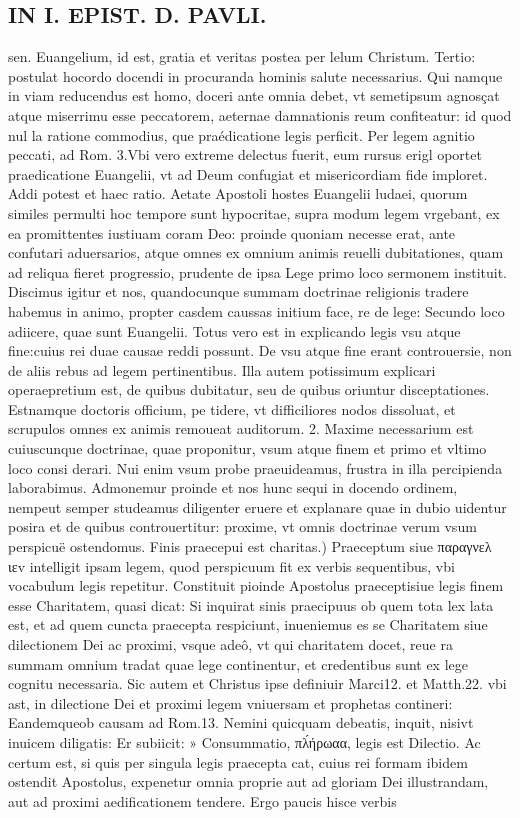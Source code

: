 \documentclass{article}
\begin{document}
\begin{pages}
\section*{IN I. EPIST. D. PAVLI. }
\marginpar{[ p.21 ]}\pstart sen. Euangelium, id est, gratia et veritas postea per lelum Christum.  \pend\pstart Tertio: postulat hocordo docendi in procuranda hominis salute necessarius. Qui namque  in viam reducendus est homo, doceri ante omnia debet, vt semetipsum agnosçat atque  miserrimu esse peccatorem, aeternae damnationis reum confiteatur: id quod nul la ratione commodius, que  praédicatione legis perficit. Per legem agnitio peccati, ad Rom. 3.Vbi vero extreme delectus fuerit, eum rursus erigl oportet praedicatione Euangelii, vt ad Deum confugiat et misericordiam fide imploret.  \pend\pstart Addi potest et haec ratio. Aetate Apostoli hostes Euangelii ludaei, quorum similes permulti hoc tempore sunt hypocritae, supra modum legem vrgebant, ex ea promittentes iustiuam coram Deo: proinde quoniam necesse erat, ante confutari aduersarios, atque omnes ex omnium animis reuelli dubitationes, quam ad reliqua fieret progressio, prudente de ipsa Lege primo loco sermonem instituit. Discimus igitur et nos, quandocunque  summam doctrinae religionis tradere habemus in animo, propter casdem caussas initium face, re de lege: Secundo loco adiicere, quae sunt Euangelii. Totus vero est in explicando legis vsu atque  fine:cuius rei duae causae reddi possunt. De vsu atque  fine erant controuersie, non de aliis rebus ad legem pertinentibus. Illa autem potissimum explicari operaepretium est, de quibus dubitatur, seu de quibus oriuntur disceptationes. Estnamque  doctoris officium, pe tidere, vt difficiliores nodos dissoluat, et scrupulos omnes ex animis remoueat auditorum. 2. Maxime necessarium est cuiuscunque  doctrinae, quae proponitur, vsum atque  finem et primo et vltimo loco consi derari. Nui enim vsum probe praeuideamus, frustra in illa percipienda laborabimus. Admonemur proinde et nos hunc sequi in docendo ordinem, nempeut semper studeamus diligenter eruere et explanare quae in dubio uidentur posira et de quibus controuertitur: proxime, vt omnis doctrinae verum vsum perspicuë ostendomus.  \pend\pstart Finis praecepui est charitas.) Praeceptum siue παραγνελ ιεv intelligit ipsam legem, quod perspicuum fit ex verbis sequentibus, vbi vocabulum legis repetitur. Constituit pioinde Apostolus praeceptisiue legis finem esse Charitatem, quasi dicat: Si inquirat sinis praecipuus ob quem tota lex lata est, et ad quem cuncta praecepta respiciunt, inueniemus es se Charitatem siue dilectionem Dei ac proximi, vsque  adeô, vt qui charitatem docet, reue ra summam omnium tradat quae lege continentur, et credentibus sunt ex lege cognitu necessaria. Sic autem et Christus ipse definiuir Marci12. et Matth.22. vbi ast, in dilectione Dei et proximi legem vniuersam et prophetas contineri: Eandemqueob causam   ad Rom.13. Nemini quicquam debeatis, inquit, nisivt inuicem diligatis: Er subiicit: » Consummatio, πλ́ήρωαα, legis est Dilectio. Ac certum est, si quis per singula legis praecepta cat, cuius rei formam ibidem ostendit Apostolus, expenetur omnia proprie aut ad gloriam Dei illustrandam, aut ad proximi aedificationem tendere. Ergo paucis hisce verbis 
\end{pages}
\end{document}
